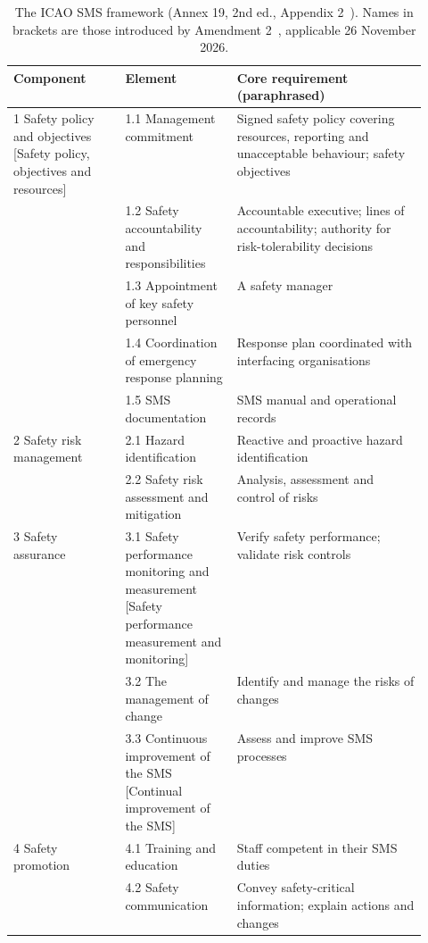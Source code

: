 \documentclass[11pt]{article}
\begin{document}
\begin{table}[!htb]
\centering
\caption{The ICAO SMS framework (Annex 19, 2nd ed., Appendix 2~\cite{icao2016annex19}). Names in brackets are those introduced by Amendment 2~\cite{icao2025amdt2}, applicable 26 November 2026.}
\label{tab:sms}
\small
\begin{tabularx}{\linewidth}{@{}>{\raggedright\arraybackslash}p{0.27\linewidth}>{\raggedright\arraybackslash}p{0.27\linewidth}>{\raggedright\arraybackslash}X@{}}
\toprule
\textbf{Component} & \textbf{Element} & \textbf{Core requirement (paraphrased)} \\
\midrule
{}1 Safety policy and objectives {[}Safety policy, objectives and resources{]} & {}1.1 Management commitment & Signed safety policy covering resources, reporting and unacceptable behaviour; safety objectives \\
 & {}1.2 Safety accountability and responsibilities & Accountable executive; lines of accountability; authority for risk-tolerability decisions \\
 & {}1.3 Appointment of key safety personnel & A safety manager \\
 & {}1.4 Coordination of emergency response planning & Response plan coordinated with interfacing organisations \\
 & {}1.5 SMS documentation & SMS manual and operational records \\
{}2 Safety risk management & {}2.1 Hazard identification & Reactive and proactive hazard identification \\
 & {}2.2 Safety risk assessment and mitigation & Analysis, assessment and control of risks \\
{}3 Safety assurance & {}3.1 Safety performance monitoring and measurement {[}Safety performance measurement and monitoring{]} & Verify safety performance; validate risk controls \\
 & {}3.2 The management of change & Identify and manage the risks of changes \\
 & {}3.3 Continuous improvement of the SMS {[}Continual improvement of the SMS{]} & Assess and improve SMS processes \\
{}4 Safety promotion & {}4.1 Training and education & Staff competent in their SMS duties \\
 & {}4.2 Safety communication & Convey safety-critical information; explain actions and changes \\
\bottomrule
\end{tabularx}
\end{table}
\end{document}
